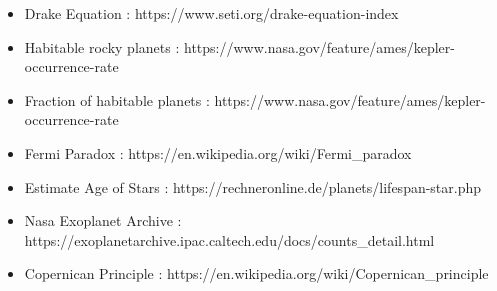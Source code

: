 \documentclass{beamer}
\begin{document}
\begin{frame}
\begin{itemize}
    \item \scriptsize{Drake Equation : \scriptsize{https://www.seti.org/drake-equation-index}}
    \item Habitable rocky planets : \scriptsize{https://www.nasa.gov/feature/ames/kepler-occurrence-rate}
    \item Fraction of habitable planets : \scriptsize{https://www.nasa.gov/feature/ames/kepler-occurrence-rate}
    \item Fermi Paradox : \scriptsize{https://en.wikipedia.org/wiki/Fermi\_paradox}
    \item Estimate Age of Stars : \scriptsize{https://rechneronline.de/planets/lifespan-star.php}
    \item Nasa Exoplanet Archive : \scriptsize{https://exoplanetarchive.ipac.caltech.edu/docs/counts\_detail.html}
    \item Copernican Principle : \scriptsize{https://en.wikipedia.org/wiki/Copernican\_principle}
\end{itemize}
\end{frame}
\end{document}
